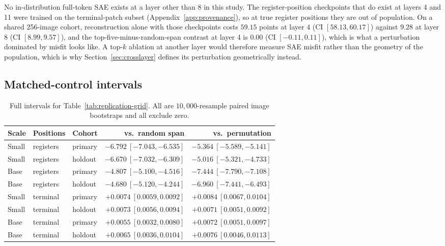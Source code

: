 \documentclass{article}
\begin{document}
No in-distribution full-token SAE exists at a layer other than 8 in this study. The register-position checkpoints that do exist at layers 4 and 11 were trained on the terminal-patch subset (Appendix~\ref{app:provenance}), so at true register positions they are out of population. On a shared 256-image cohort, reconstruction alone with those checkpoints costs $59.15$ points at layer 4 (CI $[58.13,60.17]$) against $9.28$ at layer 8 (CI $[8.99,9.57]$), and the top-five-minus-random-span contrast at layer 4 is $0.00$ (CI $[-0.11,0.11]$), which is what a perturbation dominated by misfit looks like. A top-$k$ ablation at another layer would therefore measure SAE misfit rather than the geometry of the population, which is why Section~\ref{sec:crosslayer} defines its perturbation geometrically instead.

\subsection{Matched-control intervals}

\begin{table}[h]
\centering
\caption{Full intervals for Table~\ref{tab:replication-grid}. All are $10{,}000$-resample paired image bootstraps and all exclude zero.}
\label{tab:replication-cis}
\begin{tabular}{lllrr}
\toprule
Scale & Positions & Cohort & vs.\ random span & vs.\ permutation \\
\midrule
Small & registers & primary & $-6.792\ [-7.043,-6.535]$ & $-5.364\ [-5.589,-5.141]$ \\
Small & registers & holdout & $-6.670\ [-7.032,-6.309]$ & $-5.016\ [-5.321,-4.733]$ \\
Base  & registers & primary & $-4.807\ [-5.100,-4.516]$ & $-7.444\ [-7.790,-7.108]$ \\
Base  & registers & holdout & $-4.680\ [-5.120,-4.244]$ & $-6.960\ [-7.441,-6.493]$ \\
Small & terminal  & primary & $+0.0074\ [0.0059,0.0092]$ & $+0.0084\ [0.0067,0.0104]$ \\
Small & terminal  & holdout & $+0.0073\ [0.0056,0.0094]$ & $+0.0071\ [0.0051,0.0092]$ \\
Base  & terminal  & primary & $+0.0055\ [0.0032,0.0080]$ & $+0.0072\ [0.0051,0.0097]$ \\
Base  & terminal  & holdout & $+0.0065\ [0.0036,0.0104]$ & $+0.0076\ [0.0046,0.0113]$ \\
\bottomrule
\end{tabular}
\end{table}
\end{document}
